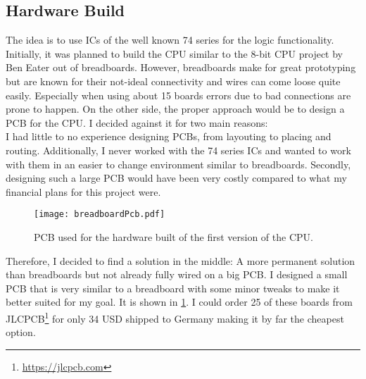 \subsection{Hardware Build}
The idea is to use \glspl{IC} of the well known 74 series for the logic functionality.
Initially, it was planned to build the \gls{CPU} similar to the 8-bit CPU project by Ben Eater \cite{eater_cpu} out of breadboards.
However, breadboards make for great prototyping but are known for their not-ideal connectivity and wires can come loose quite easily.
Especially when using about 15 boards errors due to bad connections are prone to happen.
On the other side, the proper approach would be to design a \gls{PCB} for the \gls{CPU}.
I decided against it for two main reasons:\\
I had little to no experience designing \glspl{PCB}, from layouting to placing and routing.
Additionally, I never worked with the 74 series \glspl{IC} and wanted to work with them in an easier to change environment similar to breadboards.
Secondly, designing such a large \gls{PCB} would have been very costly compared to what my financial plans for this project were.

\begin{figure}[t]
  \centering
  \texttt{[image: breadboardPcb.pdf]}
  \caption{\gls{PCB} used for the hardware built of the first version of the \gls{CPU}.}
  \label{fig:breadboardPcb}
\end{figure}
Therefore, I decided to find a solution in the middle: A more permanent solution than breadboards but not already fully wired on a big \gls{PCB}.
I designed a small \gls{PCB} that is very similar to a breadboard with some minor tweaks to make it better suited for my goal.
It is shown in \cref{fig:breadboardPcb}.
I could order 25 of these boards from JLCPCB\footnote{\url{https://jlcpcb.com}} for only 34 USD shipped to Germany making it by far the cheapest option.

